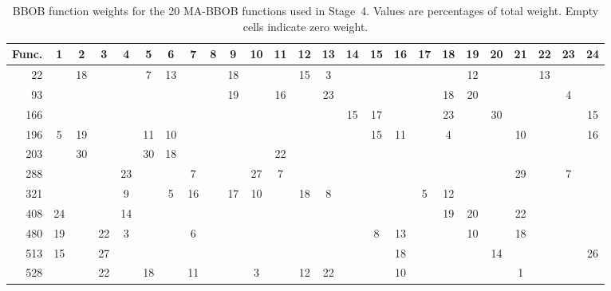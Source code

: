 \begin{table}[!t]
\centering
\caption{BBOB function weights for the 20 MA-BBOB functions used in Stage~4. Values are percentages of total weight. Empty cells indicate zero weight.}
\label{tab:instance-weights-phase4}
\scriptsize
\begin{tabular}{@{}r|cccccccccccccccccccccccc@{}}
\toprule
\textbf{Func.} & \textbf{1} & \textbf{2} & \textbf{3} & \textbf{4} & \textbf{5} & \textbf{6} & \textbf{7} & \textbf{8} & \textbf{9} & \textbf{10} & \textbf{11} & \textbf{12} & \textbf{13} & \textbf{14} & \textbf{15} & \textbf{16} & \textbf{17} & \textbf{18} & \textbf{19} & \textbf{20} & \textbf{21} & \textbf{22} & \textbf{23} & \textbf{24} \\
\midrule
22  &    & 18 &    &    & 7  & 13 &    &    & 18 &    &    & 15 & 3  &    &    &    &    &    & 12 &    &    & 13 &    &    \\
93  &    &    &    &    &    &    &    &    & 19 &    & 16 &    & 23 &    &    &    &    & 18 & 20 &    &    &    & 4  &    \\
166 &    &    &    &    &    &    &    &    &    &    &    &    &    & 15 & 17 &    &    & 23 &    & 30 &    &    &    & 15 \\
196 & 5  & 19 &    &    & 11 & 10 &    &    &    &    &    &    &    &    & 15 & 11 &    & 4  &    &    & 10 &    &    & 16 \\
203 &    & 30 &    &    & 30 & 18 &    &    &    &    & 22 &    &    &    &    &    &    &    &    &    &    &    &    &    \\
288 &    &    &    & 23 &    &    & 7  &    &    & 27 & 7  &    &    &    &    &    &    &    &    &    & 29 &    & 7  &    \\
321 &    &    &    & 9  &    & 5  & 16 &    & 17 & 10 &    & 18 & 8  &    &    &    & 5  & 12 &    &    &    &    &    &    \\
408 & 24 &    &    & 14 &    &    &    &    &    &    &    &    &    &    &    &    &    & 19 & 20 &    & 22 &    &    &    \\
480 & 19 &    & 22 & 3  &    &    & 6  &    &    &    &    &    &    &    & 8  & 13 &    &    & 10 &    & 18 &    &    &    \\
513 & 15 &    & 27 &    &    &    &    &    &    &    &    &    &    &    &    & 18 &    &    &    & 14 &    &    &    & 26 \\
528 &    &    & 22 &    & 18 &    & 11 &    &    & 3  &    & 12 & 22 &    &    & 10 &    &    &    &    & 1  &    &    &    \\

\end{tabular}
\end{table}

